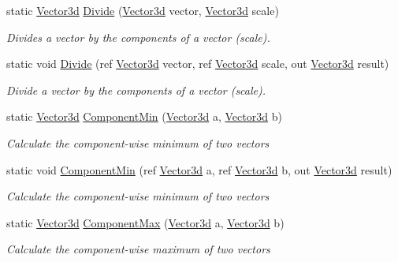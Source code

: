 \begin{DoxyCompactItemize}
static \hyperlink{struct_open_t_k_1_1_vector3d}{Vector3d} \hyperlink{struct_open_t_k_1_1_vector3d_a75e526d29ab50ffbcb2290087cc9ab30}{Divide} (\hyperlink{struct_open_t_k_1_1_vector3d}{Vector3d} vector, \hyperlink{struct_open_t_k_1_1_vector3d}{Vector3d} scale)
\begin{DoxyCompactList}\small\item\em Divides a vector by the components of a vector (scale). \end{DoxyCompactList}\item 
static void \hyperlink{struct_open_t_k_1_1_vector3d_a4603043bb746f7921aa124392348997a}{Divide} (ref \hyperlink{struct_open_t_k_1_1_vector3d}{Vector3d} vector, ref \hyperlink{struct_open_t_k_1_1_vector3d}{Vector3d} scale, out \hyperlink{struct_open_t_k_1_1_vector3d}{Vector3d} result)
\begin{DoxyCompactList}\small\item\em Divide a vector by the components of a vector (scale). \end{DoxyCompactList}\item 
static \hyperlink{struct_open_t_k_1_1_vector3d}{Vector3d} \hyperlink{struct_open_t_k_1_1_vector3d_af9c428e9141aa1d67b6c3a3b6c9c19e9}{Component\-Min} (\hyperlink{struct_open_t_k_1_1_vector3d}{Vector3d} a, \hyperlink{struct_open_t_k_1_1_vector3d}{Vector3d} b)
\begin{DoxyCompactList}\small\item\em Calculate the component-\/wise minimum of two vectors \end{DoxyCompactList}\item 
static void \hyperlink{struct_open_t_k_1_1_vector3d_aaf69f7b58e905d3fd535d5510a2b4b90}{Component\-Min} (ref \hyperlink{struct_open_t_k_1_1_vector3d}{Vector3d} a, ref \hyperlink{struct_open_t_k_1_1_vector3d}{Vector3d} b, out \hyperlink{struct_open_t_k_1_1_vector3d}{Vector3d} result)
\begin{DoxyCompactList}\small\item\em Calculate the component-\/wise minimum of two vectors \end{DoxyCompactList}\item 
static \hyperlink{struct_open_t_k_1_1_vector3d}{Vector3d} \hyperlink{struct_open_t_k_1_1_vector3d_a1f3653005760ef494642e954414bc774}{Component\-Max} (\hyperlink{struct_open_t_k_1_1_vector3d}{Vector3d} a, \hyperlink{struct_open_t_k_1_1_vector3d}{Vector3d} b)
\begin{DoxyCompactList}\small\item\em Calculate the component-\/wise maximum of two vectors \end{DoxyCompactList}\item 

\end{DoxyCompactItemize}
